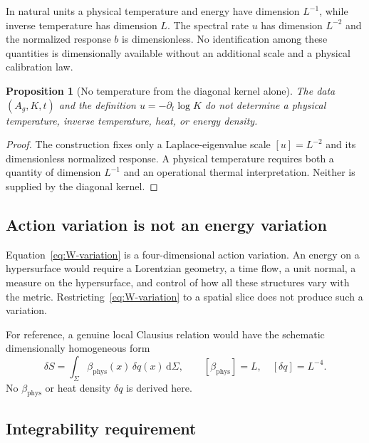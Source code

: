 \documentclass[12pt,a4paper]{article}
\newtheorem{proposition}[theorem]{Proposition}
\theoremstyle{definition}
\newcommand{\Ag}{A_g}
\newcommand{\dd}{\mathrm{d}}
\begin{document}
      In natural units a physical temperature and energy have dimension $L^{-1}$, while inverse temperature has
      dimension $L$.
      The spectral rate $u$ has dimension $L^{-2}$ and the normalized response $b$ is dimensionless.
      No identification among these quantities is dimensionally available without an additional scale and a physical
      calibration law.

      \begin{proposition}[No temperature from the diagonal kernel alone]
        \label{thm:first-law}
        The data $(\Ag,K,t)$ and the definition $u=-\partial_t\log K$ do not determine a physical temperature,
        inverse temperature, heat, or energy density.
      \end{proposition}

      \begin{proof}
        The construction fixes only a Laplace-eigenvalue scale $[u]=L^{-2}$ and its dimensionless normalized response.
        A physical temperature requires both a quantity of dimension $L^{-1}$ and an operational thermal
        interpretation.
        Neither is supplied by the diagonal kernel.
      \end{proof}

    \subsection{Action variation is not an energy variation}

      Equation~\eqref{eq:W-variation} is a four-dimensional action variation.
      An energy on a hypersurface would require a Lorentzian geometry, a time flow, a unit normal, a measure on the
      hypersurface, and control of how all these structures vary with the metric.
      Restricting~\eqref{eq:W-variation} to a spatial slice does not produce such a variation.

      For reference, a genuine local Clausius relation would have the schematic dimensionally homogeneous form
      \begin{equation}
        \delta S
        =\int_\Sigma\beta_{\mathrm{phys}}(x)\,\delta q(x)\,\dd\Sigma,
        \qquad
        [\beta_{\mathrm{phys}}]=L,
        \quad
        [\delta q]=L^{-4}.
        \label{eq:first-law}
      \end{equation}
      No $\beta_{\mathrm{phys}}$ or heat density $\delta q$ is derived here.

    \subsection{Integrability requirement}
\end{document}
